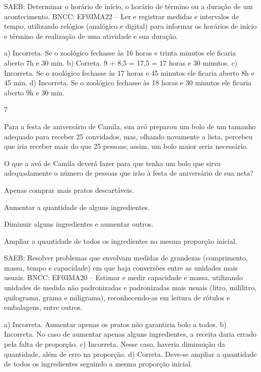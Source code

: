 {\begin{escolha}
{SAEB: Determinar o horário de início, o horário de término ou a duração de um acontecimento.
BNCC: EF03MA22 -- Ler e registrar medidas e intervalos de tempo, utilizando relógios (analógico e
digital) para informar os horários de início e término de realização de uma atividade e sua duração.

a) Incorreta. Se o zoológico fechasse às 16 horas e trinta minutos ele ficaria aberto 7h e 30 min.
b) Correta. 9 + 8,5 = 17,5 = 17 horas e 30 minutos.
c) Incorreta. Se o zoológico fechasse às 17 horas e 45 minutos ele ficaria aberto 8h e 45 min.
d) Incorreta. Se o zoológico fechasse às 18 horas e 30 minutos ele ficaria aberto 9h e 30 min.

\num{7}

Para a festa de aniversário de Camila, sua avó preparou um bolo de um tamanho adequado para receber 25 convidados, mas, olhando novamente a lista, percebeu que iria receber mais do que 25 pessoas; assim, um bolo maior seria necessário.

O que a avó de Camila deverá fazer para que tenha um bolo que sirva adequadamente o número de pessoas que irão à festa de aniversário de sua neta?

\begin{escolha}
\item
  Apenas comprar mais pratos descartáveis.
\item
  Aumentar a quantidade de alguns ingredientes.
\item
  Diminuir alguns ingredientes e aumentar outros.
\item
  Ampliar a quantidade de todos os ingredientes na mesma proporção inicial.
\end{escolha}

SAEB: Resolver problemas que envolvam medidas de grandezas (comprimento, massa, tempo e capacidade) em que haja conversões entre as
unidades mais usuais.
BNCC: EF03MA20 -- Estimar e medir capacidade e massa, utilizando unidades de medida não
padronizadas e padronizadas mais usuais (litro, mililitro, quilograma, grama e miligrama),
reconhecendo-as em leitura de rótulos e embalagens, entre outros.

a) Incorreta. Aumentar apenas os pratos não garantiria bolo a todos.
b) Incorreta. No caso de aumentar apenas alguns ingredientes, a receita daria errado pela falta de proporção.
c) Incorreta. Nesse caso, haveria diminuição da quantidade, além de erro na proporção.
d) Correta. Deve-se ampliar a quantidade de todos os ingredientes seguindo a mesma proporção inicial.

}
\end{escolha}}
